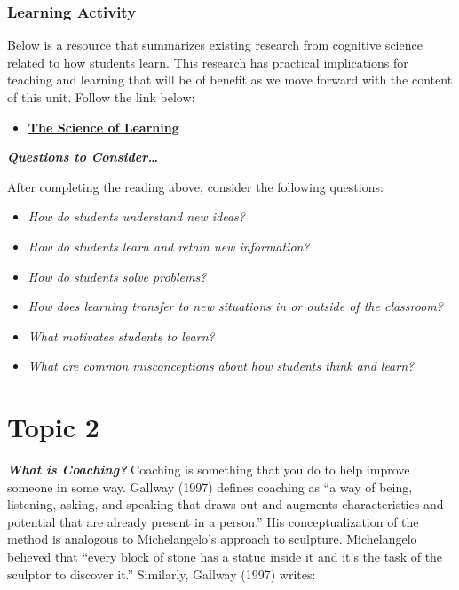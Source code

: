 \documentclass[
]{book}
\providecommand{\tightlist}{%
  \setlength{\itemsep}{0pt}\setlength{\parskip}{0pt}}
\begin{document}
\begin{reflect}
\hypertarget{learning-activity-10}{%
\subsubsection*{Learning Activity}\label{learning-activity-10}}

Below is a resource that summarizes existing research from cognitive science related to how students learn. This research has practical implications for teaching and learning that will be of benefit as we move forward with the content of this unit. Follow the link below:

\begin{itemize}
\tightlist
\item
  \href{https://deansforimpact.org/wp-content/uploads/2016/12/The_Science_of_Learning.pdf}{\textbf{The Science of Learning}}
\end{itemize}

\textbf{\emph{Questions to Consider\ldots{}}}

After completing the reading above, consider the following questions:

\begin{itemize}
\tightlist
\item
  \emph{How do students understand new ideas?}
\item
  \emph{How do students learn and retain new information?}
\item
  \emph{How do students solve problems?}
\item
  \emph{How does learning transfer to new situations in or outside of the classroom?}
\item
  \emph{What motivates students to learn?}
\item
  \emph{What are common misconceptions about how students think and learn?}
\end{itemize}
\end{reflect}

\hypertarget{topic-2}{%
\section*{Topic 2}\label{topic-2}}

\textbf{\emph{What is Coaching?}} Coaching is something that you do to help improve someone in some way. Gallway (1997) defines coaching as ``a way of being, listening, asking, and speaking that draws out and augments characteristics and potential that are already present in a person.'' His conceptualization of the method is analogous to Michelangelo's approach to sculpture. Michelangelo believed that ``every block of stone has a statue inside it and it's the task of the sculptor to discover it.'' Similarly, Gallway (1997) writes:
\end{document}
